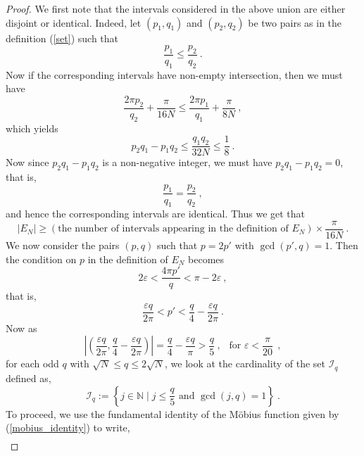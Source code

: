 \documentclass[12pt]{amsart}
\theoremstyle{definition}
\newcommand{\N}{\mathbb N}%
\numberwithin{equation}{section}
\begin{document}
\begin{proof}
We first note that the intervals considered in the above union are either disjoint or identical. Indeed, let $(p_1,q_1)$ and $(p_2,q_2)$ be two pairs as in the definition (\ref{set}) such that $$\frac{p_1}{q_1} \le \frac{p_2}{q_2}\:.$$ Now if the corresponding intervals have non-empty intersection, then we must have
\begin{equation*}
\frac{2\pi p_2}{q_2}+\frac{\pi}{16N} \le \frac{2\pi p_1}{q_1}+\frac{\pi}{8N}\:,
\end{equation*}
which yields
\begin{equation*}
p_2q_1-p_1q_2 \le \frac{q_1q_2}{32N} \le \frac{1}{8}\:.
\end{equation*}
Now since $p_2q_1-p_1q_2$ is a non-negative integer, we must have $p_2q_1-p_1q_2=0$, that is,
\begin{equation*}
\frac{p_1}{q_1} = \frac{p_2}{q_2}\:,
\end{equation*}
and hence the corresponding intervals are identical. Thus we get that
\begin{equation} \label{counting_lemma_eq1}
|E_N| \ge (\text{the number of intervals appearing in the definition of } E_N) \times \frac{\pi}{16N}\:.
\end{equation}
We now consider the pairs $(p,q)$ such that $p=2p'$ with $\gcd(p',q)=1$. Then the condition on $p$ in the definition of $E_N$ becomes
\begin{equation*}
2\varepsilon < \frac{4\pi p'}{q}<\pi - 2\varepsilon\:,
\end{equation*}
that is,
\begin{equation*}
\frac{\varepsilon q}{2\pi} < p' < \frac{q}{4}-\frac{\varepsilon q}{2\pi}\:.
\end{equation*}
Now as
\begin{equation*}
\left|\left(\frac{\varepsilon q}{2\pi}, \frac{q}{4}-\frac{\varepsilon q}{2\pi}\right)\right|=
 \frac{q}{4} - \frac{\varepsilon q}{\pi} > \frac{q}{5}\:,\:\:\text{  for }\varepsilon < \frac{\pi}{20}\:\:,
\end{equation*}
for each odd $q$ with $\sqrt{N} \le q \le 2\sqrt{N}$, we look at the cardinality of the set $\mathcal{I}_q$ defined as,
\begin{equation*}
\mathcal{I}_q := \left\{j \in \N \mid j \le \frac{q}{5}\text{ and } \gcd(j,q)=1\right\}\:.
\end{equation*}
To proceed, we use the fundamental identity of the M\"obius function given by (\ref{mobius_identity}) to write,
\begin{eqnarray*}

\end{eqnarray*}
\end{proof}
\end{document}
